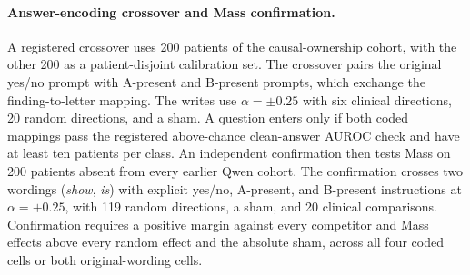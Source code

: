\paragraph{Answer-encoding crossover and Mass confirmation.} A registered crossover uses 200 patients of the causal-ownership cohort, with the other 200 as a patient-disjoint calibration set. The crossover pairs the original yes/no prompt with A-present and B-present prompts, which exchange the finding-to-letter mapping. The writes use $\alpha=\pm0.25$ with six clinical directions, 20 random directions, and a sham. A question enters only if both coded mappings pass the registered above-chance clean-answer AUROC check and have at least ten patients per class. An independent confirmation then tests Mass on 200 patients absent from every earlier Qwen cohort. The confirmation crosses two wordings (\textit{show}, \textit{is}) with explicit yes/no, A-present, and B-present instructions at $\alpha=+0.25$, with 119 random directions, a sham, and 20 clinical comparisons. Confirmation requires a positive margin against every competitor and Mass effects above every random effect and the absolute sham, across all four coded cells or both original-wording cells.

